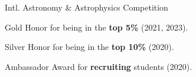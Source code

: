 \entryItem
	{Intl. Astronomy \& Astrophysics Competition}
	{}

	\begin{items}
		\item Gold Honor for being in the \textbf{top 5\%} (2021, 2023).
		\item Silver Honor for being in the \textbf{top 10\%} (2020).
		\item Ambassador Award for \textbf{recruiting} students (2020).
	\end{items}
